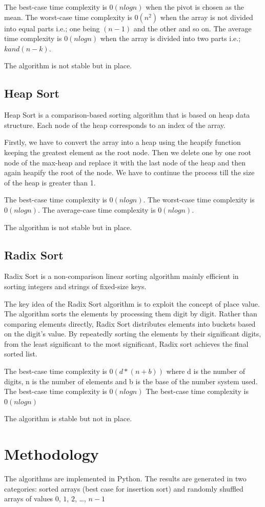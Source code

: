 \documentclass{article}
\begin{document}
The best-case time complexity is $0(nlogn)$ when the pivot is chosen as the mean.
The worst-case time complexity is $0(n^2)$ when the array is not divided into equal parts i.e.; one being $(n-1)$ and the other and so on.
The average time complexity is $0(nlogn)$ when the array is divided into two parts i.e.; $k and (n-k)$.

The algorithm is not stable but in place.
\subsection{Heap Sort}
Heap Sort is a comparison-based sorting algorithm that is based on heap data structure. Each node of the heap corresponds to an index of the array.

Firstly, we have to convert the array into a heap using the heapify function keeping the greatest element as the root node. Then we delete one by one root node of the max-heap and replace it with the last node of the heap and then again heapify the root of the node. We have to continue the process till the size of the heap is greater than 1. 

The best-case time complexity is $0(nlogn)$.
The worst-case time complexity is $0(nlogn)$.
The average-case time complexity is $0(nlogn)$.

The algorithm is not stable but in place.
\subsection{Radix Sort}
Radix Sort is a non-comparison linear sorting algorithm mainly efficient in sorting integers and strings of fixed-size keys.

The key idea of the Radix Sort algorithm is to exploit the concept of place value. The algorithm sorts the elements by processing them digit by digit. Rather than comparing elements directly, Radix Sort distributes elements into buckets based on the digit's value. By repeatedly sorting the elements by their significant digits, from the least significant to the most significant, Radix sort achieves the final sorted list.

The best-case time complexity is $0(d*(n+b))$ where d is the number of digits, n is the number of elements and b is the base of the number system used.
The best-case time complexity is $0(nlogn)$ 
The best-case time complexity is $0(nlogn)$ 

The algorithm is stable but not in place.

\section{Methodology}
The algorithms are implemented in Python.
The results are generated in two categories: sorted arrays (best case for insertion sort) and randomly shuffled arrays of values $0$, $1$, $2$, \dots, $n-1$
\end{document}
